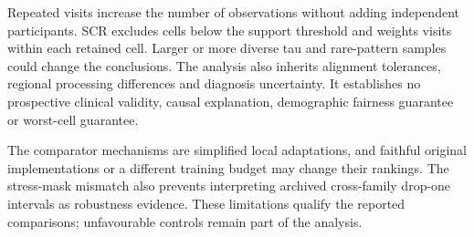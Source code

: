 Repeated visits increase the number of observations without adding independent participants. SCR excludes cells below the support threshold and weights visits within each retained cell. Larger or more diverse tau and rare-pattern samples could change the conclusions. The analysis also inherits alignment tolerances, regional processing differences and diagnosis uncertainty. It establishes no prospective clinical validity, causal explanation, demographic fairness guarantee or worst-cell guarantee.

The comparator mechanisms are simplified local adaptations, and faithful original implementations or a different training budget may change their rankings. The stress-mask mismatch also prevents interpreting archived cross-family drop-one intervals as robustness evidence. These limitations qualify the reported comparisons; unfavourable controls remain part of the analysis.
